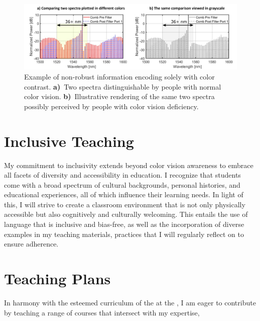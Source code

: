 \begin{figure}[!t]%
    \centering
    \includegraphics[width=0.95\linewidth]{../../fig/color.pdf}
    \caption{Example of non-robust information encoding solely with color contrast. \textbf{a)}~Two spectra distinguishable by people with normal color vision. \textbf{b)}~Illustrative rendering of the same two spectra possibly perceived by people with color vision deficiency.}
    \label{fig:color}
\end{figure}

\section{Inclusive Teaching}
My commitment to inclusivity extends beyond color vision awareness to embrace all facets of diversity and accessibility in education. I recognize that students come with a broad spectrum of cultural backgrounds, personal histories, and educational experiences, all of which influence their learning needs. In light of this, I will strive to create a classroom environment that is not only physically accessible but also cognitively and culturally welcoming. This entails the use of language that is inclusive and bias-free, as well as the incorporation of diverse examples in my teaching materials, practices that I will regularly reflect on to ensure adherence.


\section{Teaching Plans}
In harmony with the esteemed curriculum of the \appDept{} at the \appSchool{}, I am eager to contribute by teaching a range of courses that intersect with my expertise,%